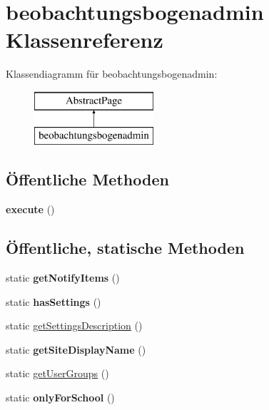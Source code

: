 \hypertarget{classbeobachtungsbogenadmin}{}\section{beobachtungsbogenadmin Klassenreferenz}
\label{classbeobachtungsbogenadmin}
Klassendiagramm für beobachtungsbogenadmin\+:\begin{figure}[H]
\begin{center}
\leavevmode
\includegraphics[height=2.000000cm]{classbeobachtungsbogenadmin}
\end{center}
\end{figure}
\subsection*{Öffentliche Methoden}
\begin{DoxyCompactItemize}
\item 
\mbox{\label{classbeobachtungsbogenadmin_a9d03f897eabbb6c68e0dfb9e2a941438}} 
{\bfseries execute} ()
\end{DoxyCompactItemize}
\subsection*{Öffentliche, statische Methoden}
\begin{DoxyCompactItemize}
\item 
\mbox{\label{classbeobachtungsbogenadmin_abb8caa2bc6dbb22f572e34292bfc2745}} 
static {\bfseries get\+Notify\+Items} ()
\item 
\mbox{\label{classbeobachtungsbogenadmin_ad6b8b6a108cd1f3aa66bded0869df1d7}} 
static {\bfseries has\+Settings} ()
\item 
static \mbox{\hyperlink{classbeobachtungsbogenadmin_a3d80383407a6ca289cd852a90e7ccc25}{get\+Settings\+Description}} ()
\item 
\mbox{\label{classbeobachtungsbogenadmin_a3777527dc70e40e1e8b30cd23e450b8e}} 
static {\bfseries get\+Site\+Display\+Name} ()
\item 
static \mbox{\hyperlink{classbeobachtungsbogenadmin_a6f3bf1022ae36389e0cc5434c540744f}{get\+User\+Groups}} ()
\item 
\mbox{\label{classbeobachtungsbogenadmin_ab7729a2eb92d92cc94cefc4a6fab9aa0}} 
static {\bfseries only\+For\+School} ()
\end{DoxyCompactItemize}
